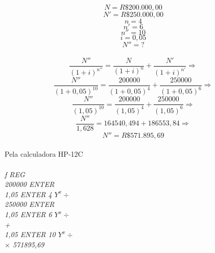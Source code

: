 \documentclass[a4paper, 12pt]{article}
\begin{document}
\begin{itemize}
$$ N = R\$200.000,00 $$
$$ N' = R\$250.000,00 $$
$$ n  = 4 $$
$$ n' = 6 $$
$$ n'' = 10 $$  
$$ i = 0,05 $$
$$ N'' = ? $$  
\\
$$ \frac{N''}{(1+i)^{n''}} = \frac{N}{(1+i)^{n}} + \frac{N'}{(1+i)^{n'}} \Rightarrow $$
$$ \frac{N''}{(1+0,05)^{10}} = \frac{200000}{(1+0,05)^{4}} + \frac{250000}{(1+0,05)^{6}} \Rightarrow $$
$$ \frac{N''}{(1,05)^{10}} = \frac{200000}{(1,05)^{4}} + \frac{250000}{(1,05)^{6}} \Rightarrow $$
$$ \frac{N''}{1,628} = 164540,494 + 186553,84 \Rightarrow $$
$$ \boxed{N'' = R\$ 571.895,69} $$
\\
Pela calculadora HP-12C\\\\
\emph{f REG}\\
\emph{200000 ENTER}\\
\emph{1,05 ENTER 4 $ Y^x  \div $}\\
\emph{250000 ENTER}\\
\emph{1,05 ENTER 6 $ Y^x  \div $}\\
\emph{+}\\
\emph{1,05 ENTER 10 $Y^x  \div $}\\
\emph{$ \times $ 571895,69}\\

\end{itemize}
\end{document}
